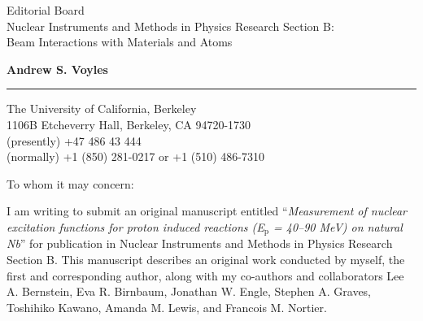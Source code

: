 \documentclass{letter} %
\begin{document}
\signature{Andrew S. Voyles}           %
\longindentation=0pt                       %
\let\raggedleft\raggedright                %
 
 
\begin{letter}{Editorial Board \\
Nuclear Instruments and Methods in Physics Research Section B: \\
Beam Interactions with Materials and Atoms}


\begin{flushleft}
{\large\bf Andrew S. Voyles}
\end{flushleft}
\medskip\hrule height 1pt
\begin{flushright}
\hfill The University of California, Berkeley \\
\hfill 1106B Etcheverry Hall, Berkeley, CA  94720-1730 \\
\hfill (presently) +47 486 43 444 \\ 
\hfill (normally) +1 (850) 281-0217 or +1 (510) 486-7310 
\end{flushright} 
\vfill %

 
\opening{To whom it may concern:} 

  \renewcommand*{\thefootnote}{\alph{footnote}}

 
\noindent I am writing to submit an original manuscript entitled \enquote{\emph{Measurement of nuclear excitation functions for proton induced reactions (E$_{\text{p}}$ = 40--90 MeV) on natural Nb}}  for publication in Nuclear Instruments and Methods in Physics Research Section B.  This manuscript describes an original work conducted by myself, the first and corresponding author, along with my co-authors and collaborators Lee A. Bernstein\footnotemark[1]\footnotemark[2], Eva R. Birnbaum\footnotemark[3], Jonathan W. Engle\footnotemark[4], Stephen A. Graves\footnotemark[5], Toshihiko Kawano\footnotemark[6], Amanda M. Lewis\footnotemark[2], and Francois M. Nortier\footnotemark[3].



\end{letter}
\end{document}
